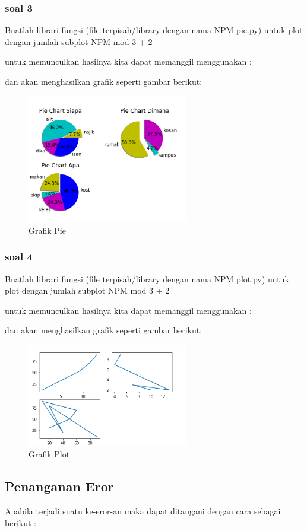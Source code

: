 \subsubsection{soal 3}
Buatlah librari fungsi (ﬁle terpisah/library dengan nama NPM pie.py) untuk plot dengan jumlah subplot NPM mod 3 + 2

untuk memunculkan hasilnya kita dapat memanggil menggunakan :


dan akan menghasilkan grafik seperti gambar berikut:
\begin{figure}[H]
\centering
\includegraphics[width=7cm]{figures/6/1174034/Praktek/p3.png}
\caption{Grafik Pie}
\label{Ichsan}
\end{figure}


\subsubsection{soal 4}
Buatlah librari fungsi (ﬁle terpisah/library dengan nama NPM plot.py) untuk plot dengan jumlah subplot NPM mod 3 + 2

untuk memunculkan hasilnya kita dapat memanggil menggunakan :


dan akan menghasilkan grafik seperti gambar berikut:
\begin{figure}[H]
\centering
\includegraphics[width=7cm]{figures/6/1174034/Praktek/p4.png}
\caption{Grafik Plot}
\label{Ichsan}
\end{figure}

\subsection{Penanganan Eror}
Apabila terjadi suatu ke-eror-an maka dapat ditangani dengan cara sebagai berikut :

